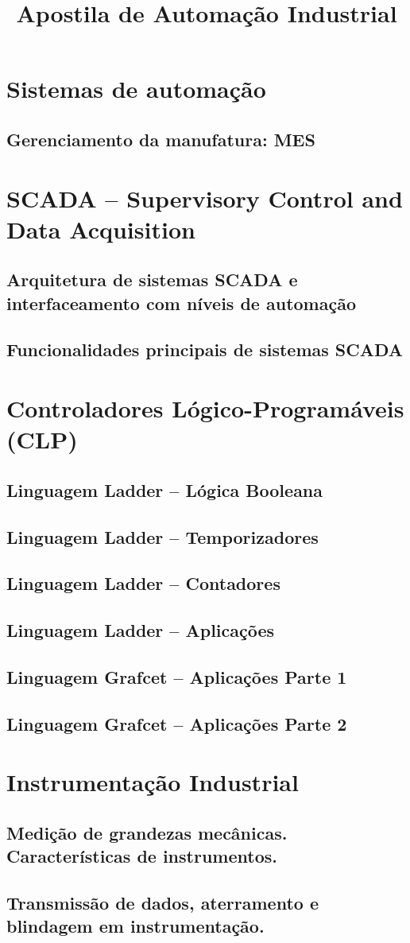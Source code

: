 \documentclass[12pt,oneside]{report}
\title{Apostila de Automação Industrial}
\begin{document}
\maketitle
\tableofcontents
\chapter{Sistemas de automação}


\section{Gerenciamento da manufatura: MES}

\chapter{SCADA -- Supervisory Control and Data Acquisition}
\section{Arquitetura de sistemas SCADA e interfaceamento com níveis de automação}
\section{Funcionalidades principais de sistemas SCADA}

\chapter{Controladores Lógico-Programáveis (CLP)}


\section{Linguagem Ladder – Lógica Booleana}

\section{Linguagem Ladder – Temporizadores}
\section{Linguagem Ladder – Contadores}
\section{Linguagem Ladder – Aplicações}

\section{Linguagem Grafcet – Aplicações Parte 1}
\section{Linguagem Grafcet – Aplicações Parte 2}
\chapter{Instrumentação Industrial}
\section{Medição de grandezas mecânicas. Características de instrumentos.}
\section{Transmissão de dados, aterramento e blindagem em instrumentação.}
\end{document}
